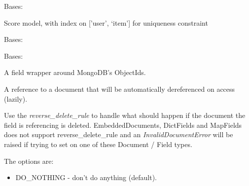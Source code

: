 \documentclass[letterpaper,10pt,english]{sphinxmanual}
\begin{document}
\begin{fulllineitems}
\label{app:app.models.Score}
Bases: 

Score model, with index on {[}'user', `item'{]} for uniqueness constraint

\begin{fulllineitems}
\label{app:app.models.Score.DoesNotExist}
Bases: 

\end{fulllineitems}


\begin{fulllineitems}
\label{app:app.models.Score.MultipleObjectsReturned}
Bases: 

\end{fulllineitems}


\begin{fulllineitems}
\label{app:app.models.Score.id}
A field wrapper around MongoDB's ObjectIds.

\end{fulllineitems}


\begin{fulllineitems}
\label{app:app.models.Score.item}
A reference to a document that will be automatically dereferenced on
access (lazily).

Use the \emph{reverse\_delete\_rule} to handle what should happen if the document
the field is referencing is deleted.  EmbeddedDocuments, DictFields and
MapFields does not support reverse\_delete\_rule and an \emph{InvalidDocumentError}
will be raised if trying to set on one of these Document / Field types.

The options are:
\begin{itemize}
\item {} 
DO\_NOTHING  - don't do anything (default).


\end{itemize}
\end{fulllineitems}
\end{fulllineitems}
\end{document}
